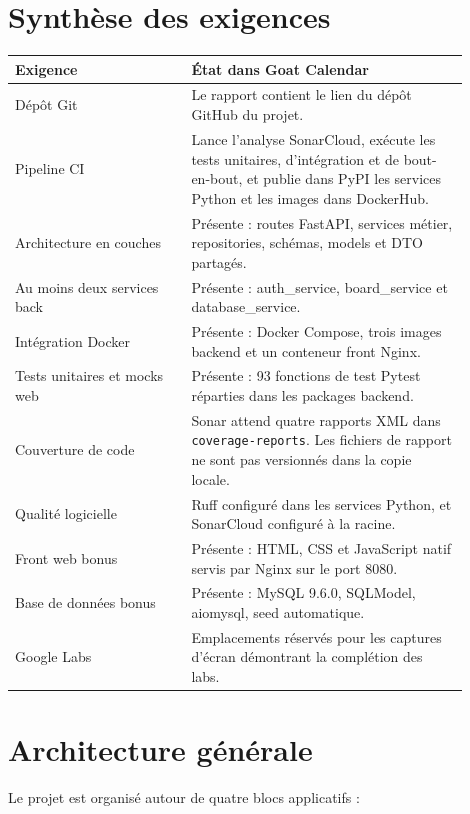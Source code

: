 \documentclass[a4paper,11pt]{article}
\begin{document}
\section{Synthèse des exigences}

\begin{longtable}{p{0.35\linewidth}p{0.55\linewidth}}
\toprule
\textbf{Exigence} & \textbf{État dans Goat Calendar} \\
\midrule
Dépôt Git & Le rapport contient le lien du dépôt GitHub du projet. \\
Pipeline CI & Lance l'analyse SonarCloud, exécute les tests unitaires, d'intégration et de bout-en-bout, et publie dans PyPI les services Python et les images dans DockerHub.  \\
Architecture en couches & Présente : routes FastAPI, services métier, repositories, schémas, models et DTO partagés. \\
Au moins deux services back & Présente : auth\_service, board\_service et database\_service. \\
Intégration Docker & Présente : Docker Compose, trois images backend et un conteneur front Nginx. \\
Tests unitaires et mocks web & Présente : 93 fonctions de test Pytest réparties dans les packages backend. \\
Couverture de code & Sonar attend quatre rapports XML dans \texttt{coverage-reports}. Les fichiers de rapport ne sont pas versionnés dans la copie locale. \\
Qualité logicielle & Ruff configuré dans les services Python, et SonarCloud configuré à la racine. \\
Front web bonus & Présente : HTML, CSS et JavaScript natif servis par Nginx sur le port 8080. \\
Base de données bonus & Présente : MySQL 9.6.0, SQLModel, aiomysql, seed automatique. \\
Google Labs & Emplacements réservés pour les captures d'écran démontrant la complétion des labs. \\
\bottomrule
\end{longtable}

\section{Architecture générale}

Le projet est organisé autour de quatre blocs applicatifs :
\end{document}
